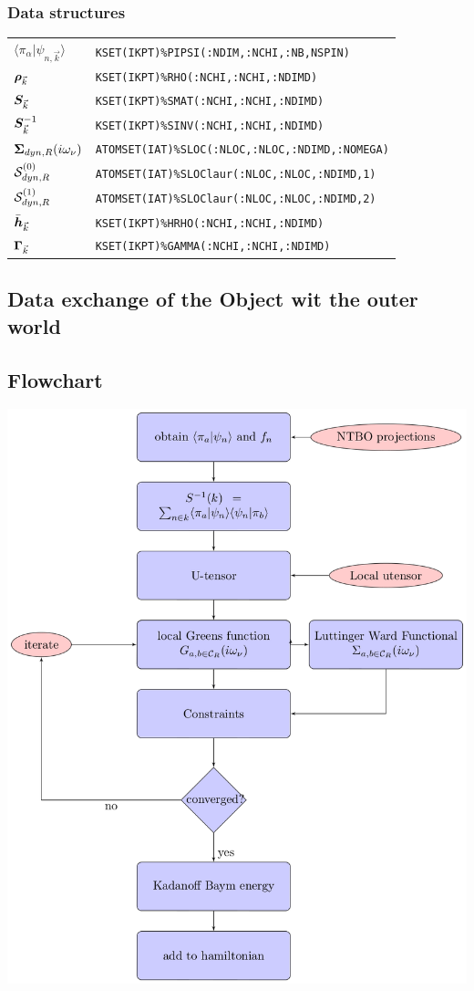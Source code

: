 \documentclass[11pt,a4paper]{report}
\begin{document}
\subsubsection{Data structures}
\begin{tabular}{|l|l|}
\hline $\langle\pi_\alpha|\psi_{n,\vec{k}}\rangle$ &
\verb|KSET(IKPT)%PIPSI(:NDIM,:NCHI,:NB,NSPIN)|\\ $\bm{\rho}_{\vec{k}}$
& \verb|KSET(IKPT)%RHO(:NCHI,:NCHI,:NDIMD)|\\ $\bm{S}_{\vec{k}}$ &
\verb|KSET(IKPT)%SMAT(:NCHI,:NCHI,:NDIMD)|\\ $\bm{S}^{-1}_{\vec{k}}$
& \verb|KSET(IKPT)%SINV(:NCHI,:NCHI,:NDIMD)|\\ \hline
$\bm{\Sigma}_{dyn,R}(i\omega_\nu)$ &
\verb|ATOMSET(IAT)%SLOC(:NLOC,:NLOC,:NDIMD,:NOMEGA)|\\ $\mathcal{\bm{S}}^{(0)}_{dyn,R}$
&
\verb|ATOMSET(IAT)%SLOClaur(:NLOC,:NLOC,:NDIMD,1)|\\ $\mathcal{\bm{S}}^{(1)}_{dyn,R}$
&
\verb|ATOMSET(IAT)%SLOClaur(:NLOC,:NLOC,:NDIMD,2)|\\ $\bar{\bm{h}}_{\vec{k}}$
&
\verb|KSET(IKPT)%HRHO(:NCHI,:NCHI,:NDIMD)|\\ $\bm{\Gamma}_{\vec{k}}$
& \verb|KSET(IKPT)%GAMMA(:NCHI,:NCHI,:NDIMD)|\\ \hline
\end{tabular}


\subsection{Data exchange of the Object wit the outer world}


\subsection{Flowchart}
\begin{center}
\includegraphics[width=0.5\linewidth]
{Figs/TikZ/FlowdiagramDMFTinterface/flow.eps}
\end{center}
\end{document}
